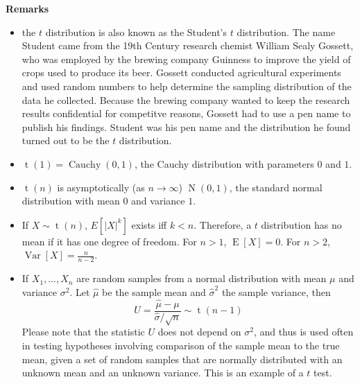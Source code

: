 \documentclass[12pt]{article}
\begin{document}
\textbf{Remarks}
\begin{itemize}
\item the $t$ distribution is also known as the Student's $t$ distribution.  The name Student came from the 19th Century research chemist William Sealy Gossett, who was employed by the brewing company Guinness to improve the yield of crops used to produce its beer.  Gossett conducted agricultural experiments and used random numbers to help determine the sampling distribution of the data he collected.  Because the brewing company wanted to keep the research results confidential for competitve reasons, Gossett had to use a pen name to publish his findings.  Student was his pen name and the distribution he found turned out to be the $t$ distribution.
\item $\operatorname{t}(1) = \operatorname{Cauchy}(0,1)$, the Cauchy distribution with parameters $0$ and $1$.
\item $\operatorname{t}(n)$ is asymptotically (as $n\rightarrow\infty$) $\operatorname{N}(0,1)$, the standard normal distribution 
with mean $0$ and variance $1$.
\item If $X\sim  \operatorname{t}(n)$, $E[|X |^k]$ exists iff $k<n$.  Therefore, a $t$ distribution has no mean if it has 
one degree of freedom.  For $n>1$, $\operatorname{E}[X] = 0$.  For $n>2$, $\operatorname{Var}[X] = \frac{n}{n-2}$.
\item If $X_1,\ldots,X_n$ are random samples from a normal distribution with mean $\mu$ and variance $\sigma^2$.  Let $\hat{\mu}$ be the sample mean and $\hat{\sigma}^2$ the sample variance, then 
$$U=\frac{\hat{\mu}-\mu}{\hat{\sigma}/\sqrt{n}}\sim \operatorname{t}(n-1)$$  Please note that the statistic $U$ does not depend on $\sigma^2$, and thus is used often in testing hypotheses involving comparison of the sample mean to the true mean, given a set of random samples that are normally distributed with an unknown mean and an unknown variance.  This is an example of a $t$ test.
\end{itemize}
\end{document}
